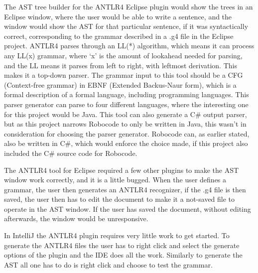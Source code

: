 The AST tree builder for the ANTLR4 Eclipse plugin would show the trees in an Eclipse window, where the user would be able to write a sentence, and the window would show the AST for that particular sentence, if it was syntactically correct, corresponding to the grammar described in a .g4 file in the Eclipse project.
ANTLR4 parses through an LL(*) algorithm, which means it can process any LL(x) grammar, where ‘x’ is the amount of lookahead needed for parsing, and the LL means it parses from left to right, with leftmost derivation. This makes it a top-down parser. The grammar input to this tool should be a CFG (Context-free grammar) in EBNF (Extended Backus-Naur form), which is a formal description of a formal language, including programming languages. This parser generator can parse to four different languages, where the interesting one for this project would be Java. This tool can also generate a C\# output parser, but as this project narrows Robocode to only be written in Java, this wasn't in consideration for choosing the parser generator. Robocode can, as earlier stated, also be written in C\#, which would enforce the choice made, if this project also included the C\# source code for Robocode.

The ANTLR4 tool for Eclipse required a few other plugins to make the AST window work correctly, and it is a little bugged. When the user defines a grammar, the user then generates an ANTLR4 recognizer, if the .g4 file is then saved, the user then has to edit the document to make it a not-saved file to operate in the AST window. If the user has saved the document, without editing afterwards, the window would be unresponsive.

In IntelliJ the ANTLR4 plugin requires very little work to get started. To generate the ANTLR4 files the user has to right click and select the generate options of the plugin and the IDE does all the work. Similarly to generate the AST all one has to do is right click and choose to test the grammar.
